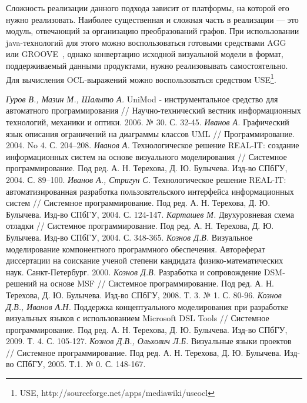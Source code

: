 \documentclass[a5paper]{article}
\begin{document}
Сложность реализации данного подхода зависит от платформы, на которой его нужно реализовать. Наиболее существенная и сложная часть в реализации --- это модуль, отвечающий за организацию преобразований графов. При использовании java-технологий для этого можно воспользоваться готовыми средствами AGG~\cite{agg} или GROOVE~\cite{groove}, однако конвертацию исходной визуальной модели в формат, поддерживаемый данными продуктами, нужно реализовывать самостоятельно. Для вычисления OCL-выражений можно воспользоваться средством USE\footnote{USE, http://sourceforge.net/apps/mediawiki/useocl}.

\begin{thebibliography}{9001}
 \emph{Гуров В., Мазин М., Шалыто А.} UniMod - инструментальное средство для автоматного программирования // Научно-технический вестник информационных технологий, механики и оптики. 2006. № 30. С. 32-45.
 \emph{Иванов А.} Графический язык описания ограничений на диаграммы классов UML // Программирование. 2004. No 4. С. 204–208.
 \emph{Иванов А.} Технологическое решение REAL-IT: создание информационных систем на основе визуального моделирования // Системное программирование. Под ред. А. Н. Терехова, Д. Ю. Булычева. Изд-во СПбГУ, 2004. С. 89–100.
 \emph{Иванов А., Стригун С.} Технологическое решение REAL-IT: автоматизированная разработка пользовательского интерфейса информационных систем // Системное программирование. Под ред. А. Н. Терехова, Д. Ю. Булычева. Изд-во СПбГУ, 2004. С. 124-147.
 \emph{Карташев М.} Двухуровневая схема отладки // Системное программирование. Под ред. А. Н. Терехова, Д. Ю. Булычева. Изд-во СПбГУ, 2004. С. 348-365.
 \emph{Кознов Д.В.} Визуальное моделирование компонентного программного обеспечения.  Автореферат диссертации на соискание ученой степени кандидата физико-математических наук. Санкт-Петербург. 2000.
 \emph{Кознов Д.В.} Разработка и сопровождение DSM-решений на основе MSF // Системное программирование. Под ред. А. Н. Терехова, Д. Ю. Булычева. Изд-во СПбГУ, 2008. Т. 3. № 1. С. 80-96.
 \emph{Кознов Д.В., Иванов А.Н.} Поддержка концептуального моделирования при разработке визуальных языков с использованием Microsoft DSL Tools // Системное программирование. Под ред. А. Н. Терехова, Д. Ю. Булычева. Изд-во СПбГУ, 2009. Т. 4. С. 105-127.
 \emph{Кознов Д.В., Ольхович Л.Б.} Визуальные языки проектов // Системное программирование. Под ред. А. Н. Терехова, Д. Ю. Булычева. Изд-во СПбГУ, 2005. Т.1. № 0. С. 148-167.

\end{thebibliography}
\end{document}
